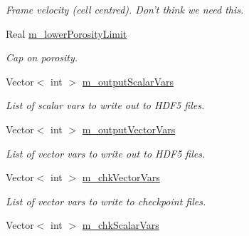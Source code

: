 \begin{DoxyCompactItemize}
\begin{DoxyCompactList}\small\item\em Frame velocity (cell centred). Don't think we need this. \end{DoxyCompactList}\item 
\hypertarget{class_a_m_r_level_mushy_layer_ae2ec059dfa56298ffbc8dc412f84da8f}{Real \hyperlink{class_a_m_r_level_mushy_layer_ae2ec059dfa56298ffbc8dc412f84da8f}{m\-\_\-lower\-Porosity\-Limit}}\label{class_a_m_r_level_mushy_layer_ae2ec059dfa56298ffbc8dc412f84da8f}

\begin{DoxyCompactList}\small\item\em Cap on porosity. \end{DoxyCompactList}\item 
\hypertarget{class_a_m_r_level_mushy_layer_a3556903e5a8df44f5e8ad9113bb782a0}{Vector$<$ int $>$ \hyperlink{class_a_m_r_level_mushy_layer_a3556903e5a8df44f5e8ad9113bb782a0}{m\-\_\-output\-Scalar\-Vars}}\label{class_a_m_r_level_mushy_layer_a3556903e5a8df44f5e8ad9113bb782a0}

\begin{DoxyCompactList}\small\item\em List of scalar vars to write out to H\-D\-F5 files. \end{DoxyCompactList}\item 
\hypertarget{class_a_m_r_level_mushy_layer_a26eb81fbe2e9bcaf1d72099d4a15cc45}{Vector$<$ int $>$ \hyperlink{class_a_m_r_level_mushy_layer_a26eb81fbe2e9bcaf1d72099d4a15cc45}{m\-\_\-output\-Vector\-Vars}}\label{class_a_m_r_level_mushy_layer_a26eb81fbe2e9bcaf1d72099d4a15cc45}

\begin{DoxyCompactList}\small\item\em List of vector vars to write out to H\-D\-F5 files. \end{DoxyCompactList}\item 
\hypertarget{class_a_m_r_level_mushy_layer_a588ea6850fbe16d53bd496961ba5427b}{Vector$<$ int $>$ \hyperlink{class_a_m_r_level_mushy_layer_a588ea6850fbe16d53bd496961ba5427b}{m\-\_\-chk\-Vector\-Vars}}\label{class_a_m_r_level_mushy_layer_a588ea6850fbe16d53bd496961ba5427b}

\begin{DoxyCompactList}\small\item\em List of vector vars to write to checkpoint files. \end{DoxyCompactList}\item 
\hypertarget{class_a_m_r_level_mushy_layer_a8d09ec620023d399fcff3c8720d846c6}{Vector$<$ int $>$ \hyperlink{class_a_m_r_level_mushy_layer_a8d09ec620023d399fcff3c8720d846c6}{m\-\_\-chk\-Scalar\-Vars}}\label{class_a_m_r_level_mushy_layer_a8d09ec620023d399fcff3c8720d846c6}


\end{DoxyCompactItemize}

